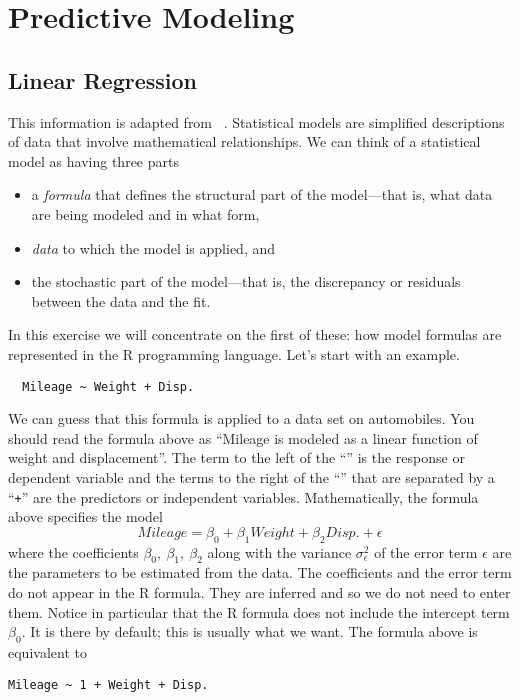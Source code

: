 \chapter{Predictive Modeling}

\section{Linear Regression}

This information is adapted from ~\cite{chambers:1992}.
Statistical models are simplified descriptions of data that involve
mathematical relationships. We can think of a statistical model as
having three parts
\begin{itemize}
\item a \emph{formula} that defines the structural part of the model---that is,
  what data are being modeled and in what form,
\item \emph{data} to which the model is applied, and
\item the stochastic part of the model---that is, 
  the discrepancy or residuals between the data and the fit.
\end{itemize}
In this exercise we will concentrate on the first of these: how model
formulas are represented in the R programming language. Let's start
with an example.
\begin{Verbatim}
  Mileage ~ Weight + Disp.
\end{Verbatim}
We can guess that this
formula is applied to a data set on automobiles. You should read the
formula above as ``Mileage is modeled as a linear function of weight
and displacement''. The term to the left of the ``\mtilde'' is the
response or dependent variable and the terms to the right of the ``\mtilde''
that are separated by a ``\texttt{+}'' are the predictors or independent variables.
Mathematically, the formula
above specifies the model
\[
  Mileage = \beta_0 + \beta_1 Weight + \beta_2 Disp. + \epsilon
\]
where the coefficients $\beta_0,~\beta_1,~\beta_2$  along with the variance $\sigma_{\epsilon}^2$ of
the error term $\epsilon$ are the parameters to be estimated from the data.
The coefficients and the error term do not appear in the R formula.
They are inferred and so we do not need to enter them. Notice in particular
that the R formula does not include the intercept term $\beta_0$. It is there
by default; this is usually what we want. The formula above is equivalent to
\begin{Verbatim}
Mileage ~ 1 + Weight + Disp.
\end{Verbatim}
